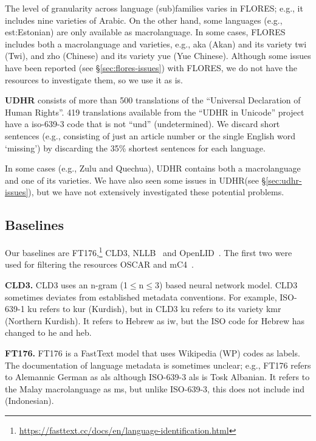\documentclass[11pt]{article}
\def\macrolanguage{macrolanguage\xspace}
\def\flores{FLORES\xspace}
\def\udhr{UDHR\xspace}
\def\ft176{FT176\xspace}
\def\edin{OpenLID\xspace}
\def\nllb{NLLB\xspace}
\def\seclabel#1{\label{sec:#1}\label{p:#1}}
\def\secref#1{\S\ref{sec:#1}}
\begin{document}
The level of granularity
across language (sub)families varies in \flores; e.g.,
it
includes nine varieties of Arabic.
On the other hand, some languages (e.g., 
est:Estonian) are only
available as \macrolanguage.
In some cases, \flores includes
both a \macrolanguage and varieties, e.g.,
 aka
(Akan) and its variety twi (Twi), and zho (Chinese) and its
variety yue (Yue Chinese).
Although some issues have been reported
(see \secref{flores-issues}) with \flores, we do
not have the resources to investigate them, so we
use it as is.



\textbf{\udhr}
consists of more than 500 translations of the
``Universal Declaration of Human Rights''.
419 translations available from the ``UDHR in Unicode'' project have a
iso-639-3 code that is not ``und'' (undetermined). 
We discard short
sentences (e.g., consisting
of just an article number or the single English word ‘missing’) by discarding the 35\% shortest
sentences for each language.

In some cases (e.g., Zulu and Quechua), UDHR
contains both a macrolanguage and one of its varieties. We have also seen some issues in \udhr (see \secref{udhr-issues}), but we have not extensively investigated these potential problems.


\subsection{Baselines}\seclabel{baselines}
Our baselines are \ft176,\footnote{\url{https://fasttext.cc/docs/en/language-identification.html}} CLD3, \nllb~\cite{nllbteam2022language} and \edin~\cite{burchell-etal-2023-open}. The first two were used for filtering
the resources OSCAR and
mC4~\cite{kreutzer-etal-2022-quality}.

\textbf{CLD3.} CLD3 uses an n-gram (1$\leq$n$\leq$3)
based neural network model. CLD3 sometimes deviates from established
metadata conventions. For example, ISO-639-1 ku refers
to kur (Kurdish), but in CLD3 ku refers to its variety kmr (Northern Kurdish). It refers to Hebrew as iw, but the ISO code for Hebrew has changed to he and heb.

\textbf{\ft176.}
\ft176 
 is a FastText model
that uses
Wikipedia (WP) codes  as labels.
The documentation of language metadata is sometimes unclear;
e.g.,
\ft176 refers to Alemannic German as als although
ISO-639-3 als is Tosk Albanian.
It refers to the Malay \macrolanguage as ms, but unlike
ISO-639-3, this does not include ind (Indonesian).
\end{document}
